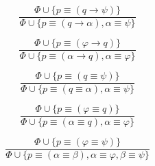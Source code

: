 \documentclass{article}
\theoremstyle{definition}
\newcommand*{\id}{\equiv}
\newcommand*{\ra}{\rightarrow}
\begin{document}
\begin{figure}
\begin{subfigure}{\textwidth}
\begin{subfigure}{0.5\textwidth}
\begin{equation}
            \end{equation}
        \end{subfigure}
        \begin{subfigure}{0.4\textwidth}
            \begin{equation}
                \tag{$ \eq_\ra^l $}
                \frac{
                    \Phi \cup \{ p \id (q \ra \psi) \} }%
                { \Phi \cup \{ p \id (q \ra \alpha), \alpha \id \psi  \} }
            \end{equation}
        \end{subfigure}
        \begin{subfigure}{0.4\textwidth}
            \begin{equation}
                \tag{$ \eq_\ra^r $}
                \frac{
                    \Phi \cup \{ p \id (\varphi \ra q) \} }%
                { \Phi \cup \{ p \id (\alpha \ra q), \alpha \id \varphi  \} }
            \end{equation}
        \end{subfigure}
        \begin{subfigure}{0.4\textwidth}
            \begin{equation}
                \tag{$ \eq_\id^l $}
                \frac{
                    \Phi \cup \{ p \id (q \id \psi) \} }%
                { \Phi \cup \{ p \id (q \id \alpha), \alpha \id \psi  \} }
            \end{equation}
        \end{subfigure}
        \begin{subfigure}{0.4\textwidth}
            \begin{equation}
                \tag{$ \eq_\id^r$}
                \frac{
                    \Phi \cup \{ p \id (\varphi \id q) \} }%
                { \Phi \cup \{ p \id (\alpha \id q), \alpha \id \varphi \} }
            \end{equation}
        \end{subfigure}
        \begin{subfigure}{0.45\textwidth}
            \begin{equation}
                \tag{$ \eq_\id $}
                \frac{
                    \Phi \cup \{ p \id (\varphi \id \psi) \} }%
                { \Phi \cup \{ p \id (\alpha \id \beta), \alpha \id \varphi, \beta \id \psi \} }
            \end{equation}
        \end{subfigure}
        \begin{subfigure}{0.4\textwidth}

\end{subfigure}
\end{subfigure}
\end{figure}
\end{document}
